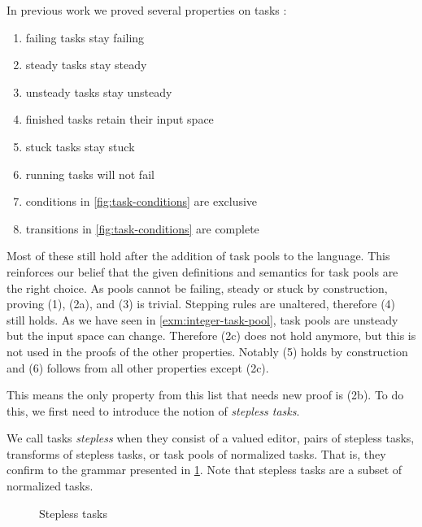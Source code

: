 In previous work we proved several properties on tasks \cite{conf/sfp/KlijnsmaS22,Steenvoorden22}:
\begin{enumerate}
  \item[(1)] failing tasks stay failing
  \item[(2a)] steady tasks stay steady
  \item[(2b)] unsteady tasks stay unsteady
  \item[(2c)] finished tasks retain their input space
  \item[(3)] stuck tasks stay stuck
  \item[(4)] running tasks will not fail
  \item[(5)] conditions in \cref{fig:task-conditions} are exclusive
  \item[(6)] transitions in \cref{fig:task-conditions} are complete
\end{enumerate}
Most of these still hold after the addition of task pools to the language.
This reinforces our belief that the given definitions and semantics for task pools are the right choice.
As pools cannot be failing, steady or stuck by construction,
proving (1), (2a), and (3) is trivial.
Stepping rules are unaltered, therefore (4) still holds.
As we have seen in \cref{exm:integer-task-pool},
task pools are unsteady but the input space can change.
Therefore (2c) does not hold anymore,
but this is not used in the proofs of the other properties.
Notably (5) holds by construction and (6) follows from all other properties except (2c).

This means the only property from this list that needs new proof is (2b).
To do this, we first need to introduce the notion of \emph{stepless tasks}.

\begin{definition}
  \label{def:stepless-task}
  We call tasks \emph{stepless} when they consist of
  a valued editor,
  pairs of stepless tasks,
  transforms of stepless tasks,
  or task pools of normalized tasks.
  That is, they confirm to the grammar presented in \cref{fig:stepless-tasks-grammar}.
  Note that stepless tasks are a subset of normalized tasks.
\end{definition}

\begin{figure}
  \caption{Stepless tasks}
  \label{fig:stepless-tasks-grammar}
\end{figure}

